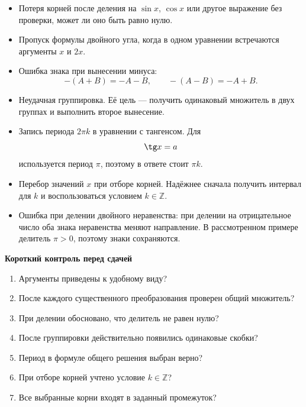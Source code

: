 \documentclass[a4paper,12pt]{article}
\newcommand{\subsect}[1]{%
  \vspace{0.35em}%
  {\large\bfseries\color{accent}#1}\par
  \vspace{0.1em}%
}
\newcommand{\Z}{\mathbb{Z}}
\begin{document}
\begin{itemize}
  \item
  Потеря корней после деления на $\sin x$, $\cos x$ или другое
  выражение без проверки, может ли оно быть равно нулю.

  \item
  Пропуск формулы двойного угла, когда в одном уравнении встречаются
  аргументы $x$ и $2x$.

  \item
  Ошибка знака при вынесении минуса:
  \[
  -(A+B)=-A-B,
  \qquad
  -(A-B)=-A+B.
  \]

  \item
  Неудачная группировка. Её цель --- получить одинаковый множитель
  в двух группах и выполнить второе вынесение.

  \item
  Запись периода $2\pi k$ в уравнении с тангенсом.
  Для
  \[
  \tg x=a
  \]
  используется период $\pi$, поэтому в ответе стоит $\pi k$.

  \item
  Перебор значений $x$ при отборе корней.
  Надёжнее сначала получить интервал для $k$ и воспользоваться
  условием $k\in\Z$.

  \item
  Ошибка при делении двойного неравенства:
  при делении на отрицательное число оба знака неравенства меняют направление.
  В рассмотренном примере делитель $\pi>0$, поэтому знаки сохраняются.
\end{itemize}

\subsect{Короткий контроль перед сдачей}

\begin{enumerate}
  \item Аргументы приведены к удобному виду?
  \item После каждого существенного преобразования проверен общий множитель?
  \item При делении обосновано, что делитель не равен нулю?
  \item После группировки действительно появились одинаковые скобки?
  \item Период в формуле общего решения выбран верно?
  \item При отборе корней учтено условие $k\in\Z$?
  \item Все выбранные корни входят в заданный промежуток?
\end{enumerate}

\clearpage
\thispagestyle{fancy}
\end{document}

